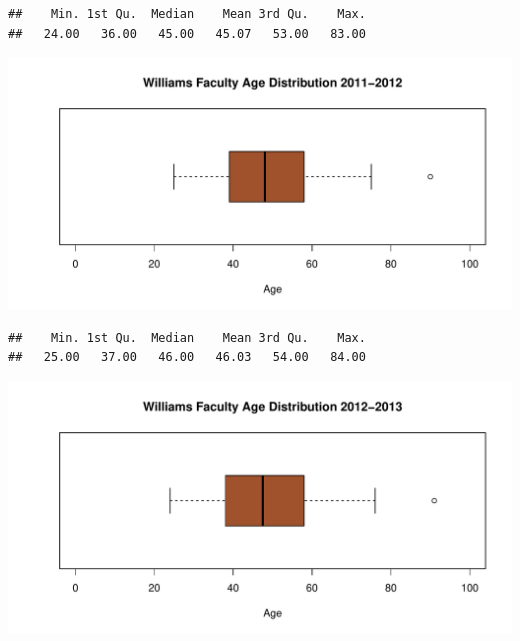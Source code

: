 \documentclass[12pt,a4paper]{article}\usepackage[]{graphicx}\usepackage[]{color}
\makeatletter
\def\maxwidth{ %
  \ifdim\Gin@nat@width>\linewidth
    \linewidth
  \else
    \Gin@nat@width
  \fi
}
\newenvironment{kframe}{%
 \def\at@end@of@kframe{}%
 \ifinner\ifhmode%
  \def\at@end@of@kframe{\end{minipage}}%
  \begin{minipage}{\columnwidth}%
 \fi\fi%
 \def\FrameCommand##1{\hskip\@totalleftmargin \hskip-\fboxsep
 \colorbox{shadecolor}{##1}\hskip-\fboxsep
     \hskip-\linewidth \hskip-\@totalleftmargin \hskip\columnwidth}%
 \MakeFramed {\advance\hsize-\width
   \@totalleftmargin\z@ \linewidth\hsize
   \@setminipage}}%
 {\par\unskip\endMakeFramed%
 \at@end@of@kframe}
\newenvironment{knitrout}{}{} %
\theoremstyle{definition}
\makeatother
\begin{document}
\begin{knitrout}
\color{fgcolor}\begin{kframe}
\begin{verbatim}
##    Min. 1st Qu.  Median    Mean 3rd Qu.    Max. 
##   24.00   36.00   45.00   45.07   53.00   83.00
\end{verbatim}
\end{kframe}
\end{knitrout}

\begin{knitrout}
\color{fgcolor}
\includegraphics[width=\maxwidth]{figure/unnamed-chunk-28-1} 

\end{knitrout}

\begin{knitrout}
\color{fgcolor}\begin{kframe}
\begin{verbatim}
##    Min. 1st Qu.  Median    Mean 3rd Qu.    Max. 
##   25.00   37.00   46.00   46.03   54.00   84.00
\end{verbatim}
\end{kframe}
\end{knitrout}


\begin{knitrout}
\color{fgcolor}
\includegraphics[width=\maxwidth]{figure/unnamed-chunk-30-1} 

\end{knitrout}
\end{document}
